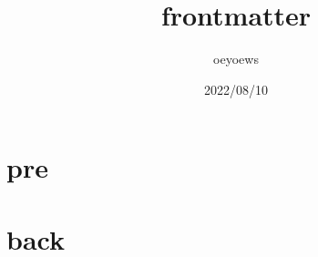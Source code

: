 \documentclass{article}
\title{frontmatter}
\author{oeyoews}
\date{2022/08/10}
\begin{document}
    \frontmatter
        \maketitle
        \chapter{pre}
    \backmatter
        \chapter{back}
\end{document}
